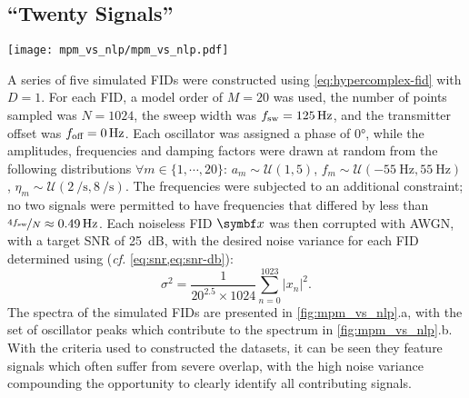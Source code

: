 \subsection{``Twenty Signals''}
\begin{sidewaysfigure}
    \centering
    \texttt{[image: mpm\_vs\_nlp/mpm\_vs\_nlp.pdf]}
    \caption[
        The result of estimating a series of 5 simulated signals comprising 20
        signals, using solely the \acs{MPM} and also with phase
        variance-regularised \acs{NLP} afterwards.
    ]{
        The result of estimating a series of 5 simulated signals comprising 20
        signals. See the main text for details on how the datasets were constructed.
        \textbf{a.} Spectra of the datasets generated.
        \textbf{b.} Spectral lines corresponding to the set of signals
        used to generate each dataset.
        \textbf{c.} Plots of peaks for each oscillator generated using
        the \acs{MPM}.
        \textbf{d.} An equivalent plot for the result after applying phase
        variance-regularised \acs{NLP}, using the \acs{MPM} result as an
        initial guess.  Also included in c. and d. is the
        residual between the data and the sum of the oscillator peaks (grey
        line). The colouring of the oscillators in c. and d. is described
        in the main text.
    }
    \label{fig:mpm_vs_nlp}
\end{sidewaysfigure}
A series of five simulated \acp{FID} were constructed using
\cref{eq:hypercomplex-fid} with $D=1$. For each \ac{FID}, a model order
of $M=20$ was used, the number of points sampled was $N = 1024$, the sweep
width was $f_{\mathrm{sw}}=\qty{125}{\hertz}$, and the transmitter offset was $f_{\text{off}}
= \qty{0}{\hertz}$.  Each oscillator was assigned a phase of \ang{0}, while the
amplitudes, frequencies and damping factors were drawn at random from the
following distributions
$\forall m \in \lbrace 1, \cdots, 20\rbrace$:
$a_m \sim \mathcal{U}(1, 5)$, $f_m \sim \mathcal{U}(\qty{-55}{\hertz},
\qty{55}{\hertz})$, $\eta_m \sim \mathcal{U}(\qty{2}{\per\second},
\qty{8}{\per\second})$. The frequencies were subjected to an additional
constraint; no two signals were permitted to have frequencies that
differed by less than $\nicefrac{4 f_{\mathrm{sw}}}{N} \approx \qty{0.49}{\hertz}$.
Each noiseless \ac{FID} $\bx$ was then corrupted with \ac{AWGN}, with a target
\ac{SNR} of \qty{25}{\deci\bel}, with the desired noise variance for each
\ac{FID} determined using (\emph{cf.} \cref{eq:snr,eq:snr-db}):
\begin{equation}
    \sigma^2 = \frac{1}{20^{2.5} \times 1024}
        \sum_{n=0}^{1023} \lvert x_n \rvert^2.
\end{equation}
The spectra of the simulated \acp{FID} are presented in
\cref{fig:mpm_vs_nlp}.a, with the set of oscillator peaks which contribute
to the spectrum in \cref{fig:mpm_vs_nlp}.b. With the criteria used to
constructed the datasets, it can be seen they feature signals which often
suffer from severe overlap, with the high noise variance compounding the
opportunity to clearly identify all contributing signals.

